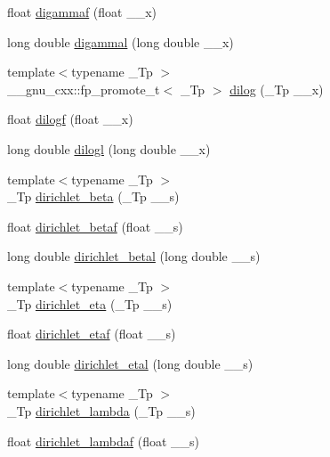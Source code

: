 \begin{DoxyCompactItemize}
\item 
float \hyperlink{group__gnu__math__spec__func_ga65b58ffe1d02ccda1113539b62d87b94}{digammaf} (float \+\_\+\+\_\+x)
\item 
long double \hyperlink{group__gnu__math__spec__func_gaaa1bf1503709175915cb81bcd4355ccf}{digammal} (long double \+\_\+\+\_\+x)
\item 
{\footnotesize template$<$typename \+\_\+\+Tp $>$ }\\\+\_\+\+\_\+gnu\+\_\+cxx\+::fp\+\_\+promote\+\_\+t$<$ \+\_\+\+Tp $>$ \hyperlink{group__gnu__math__spec__func_ga4185ee1a0f9189a18085f65d52b6bc9b}{dilog} (\+\_\+\+Tp \+\_\+\+\_\+x)
\item 
float \hyperlink{group__gnu__math__spec__func_ga901091e0e7ce7d6113ae6a86f4865a92}{dilogf} (float \+\_\+\+\_\+x)
\item 
long double \hyperlink{group__gnu__math__spec__func_gae90c13ee690ebaf10a18a900fe2646f9}{dilogl} (long double \+\_\+\+\_\+x)
\item 
{\footnotesize template$<$typename \+\_\+\+Tp $>$ }\\\+\_\+\+Tp \hyperlink{group__gnu__math__spec__func_ga87466a2d429a2815d794acc21c882b08}{dirichlet\+\_\+beta} (\+\_\+\+Tp \+\_\+\+\_\+s)
\item 
float \hyperlink{group__gnu__math__spec__func_ga9bb40e20b18e3eb822e70af955940830}{dirichlet\+\_\+betaf} (float \+\_\+\+\_\+s)
\item 
long double \hyperlink{group__gnu__math__spec__func_gaed6fd85a4577f4de66d74742a1850a13}{dirichlet\+\_\+betal} (long double \+\_\+\+\_\+s)
\item 
{\footnotesize template$<$typename \+\_\+\+Tp $>$ }\\\+\_\+\+Tp \hyperlink{group__gnu__math__spec__func_gae46e26e4107675d285c79a2d6202e6c7}{dirichlet\+\_\+eta} (\+\_\+\+Tp \+\_\+\+\_\+s)
\item 
float \hyperlink{group__gnu__math__spec__func_ga6f05d076600b1de9193e586cf89547c9}{dirichlet\+\_\+etaf} (float \+\_\+\+\_\+s)
\item 
long double \hyperlink{group__gnu__math__spec__func_ga408e2267b648f29445522dbafb7a0e1a}{dirichlet\+\_\+etal} (long double \+\_\+\+\_\+s)
\item 
{\footnotesize template$<$typename \+\_\+\+Tp $>$ }\\\+\_\+\+Tp \hyperlink{group__gnu__math__spec__func_ga06842a81bdcabf9c62252dde992d42ee}{dirichlet\+\_\+lambda} (\+\_\+\+Tp \+\_\+\+\_\+s)
\item 
float \hyperlink{group__gnu__math__spec__func_gaafd3ca6b0d71d55d3835536396eece8f}{dirichlet\+\_\+lambdaf} (float \+\_\+\+\_\+s)

\end{DoxyCompactItemize}
